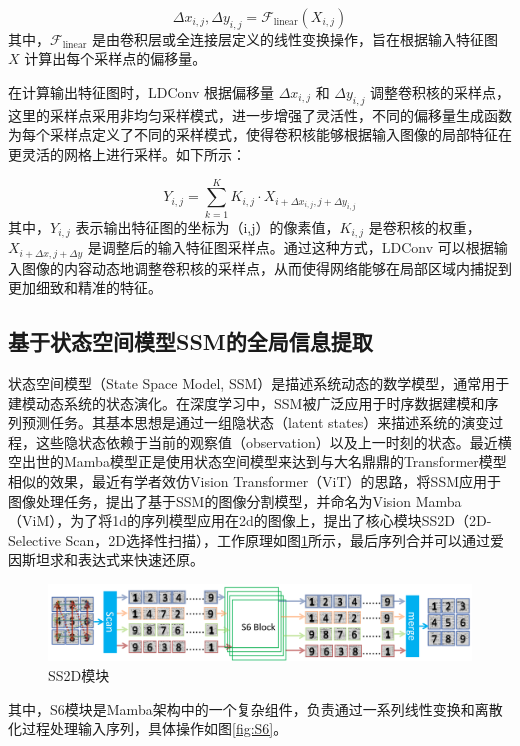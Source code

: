 \documentclass[UTF8,12pt, AutoFakeBold,fontset = founder]{ctexart}
\begin{document}
\[
\Delta x_{i,j}, \Delta y_{i,j} = \mathcal{F}_{\text{linear}}(X_{i,j})
\]
其中，\( \mathcal{F}_{\text{linear}} \) 是由卷积层或全连接层定义的线性变换操作，旨在根据输入特征图 \( X \) 计算出每个采样点的偏移量。

在计算输出特征图时，LDConv 根据偏移量 \( \Delta x_{i,j} \) 和 \( \Delta y_{i,j} \) 调整卷积核的采样点，这里的采样点采用非均匀采样模式，进一步增强了灵活性，不同的偏移量生成函数为每个采样点定义了不同的采样模式，使得卷积核能够根据输入图像的局部特征在更灵活的网格上进行采样。如下所示：  

\[
Y_{i,j} = \sum_{k=1}^{K} K_{i, j} \cdot X_{i + \Delta x_{i,j}, j + \Delta y_{i,j}}
\]
其中，\( Y_{i,j} \) 表示输出特征图的坐标为（i,j）的像素值，\( K_{i, j} \) 是卷积核的权重，\( X_{i + \Delta x, j + \Delta y} \) 是调整后的输入特征图采样点。通过这种方式，LDConv 可以根据输入图像的内容动态地调整卷积核的采样点，从而使得网络能够在局部区域内捕捉到更加细致和精准的特征。

\subsection{基于状态空间模型SSM的全局信息提取}

状态空间模型（State Space Model, SSM）是描述系统动态的数学模型，通常用于建模动态系统的状态演化。在深度学习中，SSM被广泛应用于时序数据建模和序列预测任务。其基本思想是通过一组隐状态（latent states）来描述系统的演变过程，这些隐状态依赖于当前的观察值（observation）以及上一时刻的状态。最近横空出世的Mamba模型正是使用状态空间模型来达到与大名鼎鼎的Transformer模型相似的效果，最近有学者效仿Vision Transformer（ViT）的思路，将SSM应用于图像处理任务，提出了基于SSM的图像分割模型，并命名为Vision Mamba（ViM），为了将1d的序列模型应用在2d的图像上，提出了核心模块SS2D（2D-Selective Scan，2D选择性扫描），工作原理如图\ref{fig:ss2d}所示，最后序列合并可以通过爱因斯坦求和表达式来快速还原。

\begin{figure}[H]
    \centering
    \includegraphics[width=\textwidth]{../images/ss2d.png}
    \caption{SS2D模块}
    \label{fig:ss2d}
\end{figure}

其中，S6模块是Mamba架构中的一个复杂组件，负责通过一系列线性变换和离散化过程处理输入序列，具体操作如图\ref{fig:S6}。
\end{document}

